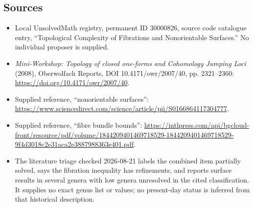 \documentclass[11pt]{article}
\begin{document}
\subsection{Sources}
\begin{itemize}
\item Local UnsolvedMath registry, permanent ID \(30000826\), source code catalogue entry, ``Topological Complexity of Fibrations and Nonorientable Surfaces.'' No individual proposer is supplied.
\item \emph{Mini-Workshop: Topology of closed one-forms and Cohomology Jumping Loci} (2008), Oberwolfach Reports, DOI 10.4171/owr/2007/40, pp. 2321--2360: \url{https://doi.org/10.4171/owr/2007/40}.
\item Supplied reference, ``nonorientable surfaces'': \url{https://www.sciencedirect.com/science/article/pii/S0166864117304777}.
\item Supplied reference, ``fibre bundle bounds'': \url{https://intlpress.com/api/bgcloud-front/resource/pdf/volume/1844209401469718529-1844209401469718529-9f4d3018c2e31aca2e3887988363e401.pdf}.
\item The literature triage checked 2026-08-21 labels the combined item partially solved, says the fibration inequality has refinements, and reports surface results in several genera with low genera unresolved in the cited classification. It supplies no exact genus list or values; no present-day status is inferred from that historical description.
\end{itemize}
\end{document}
